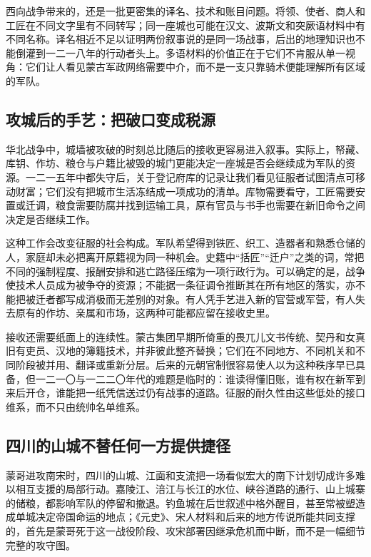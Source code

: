 西向战争带来的，还是一批更密集的译名、技术和账目问题。将领、使者、商人和工匠在不同文字里有不同转写；同一座城也可能在汉文、波斯文和突厥语材料中有不同名称。译名相近不足以证明两份叙事说的是同一场战事，后出的地理知识也不能倒灌到一二一八年的行动者头上。多语材料的价值正在于它们不肯服从单一视角：它们让人看见蒙古军政网络需要中介，而不是一支只靠骑术便能理解所有区域的军队。

\subsection{攻城后的手艺：把破口变成税源}

华北战争中，城墙被攻破的时刻总比随后的接收更容易进入叙事。实际上，帑藏、库钥、作坊、粮仓与户籍比被毁的城门更能决定一座城是否会继续成为军队的资源。一二一五年中都失守后，关于登记府库的记录让我们看见征服者试图清点可移动财富；它们没有把城市生活冻结成一项成功的清单。库物需要看守，工匠需要安置或迁调，粮食需要防腐并找到运输工具，原有官员与书手也需要在新旧命令之间决定是否继续工作。

这种工作会改变征服的社会构成。军队希望得到铁匠、织工、造器者和熟悉仓储的人，家庭却未必把离开原籍视为同一种机会。史籍中“括匠”“迁户”之类的词，常把不同的强制程度、报酬安排和逃亡路径压缩为一项行政行为。可以确定的是，战争使技术人员成为被争夺的资源；不能据一条征调令推断其在所有地区的落实，亦不能把被迁者都写成消极而无差别的对象。有人凭手艺进入新的官营或军营，有人失去原有的作坊、亲属和市场，这两种可能都应留在接收史里。

接收还需要纸面上的连续性。蒙古集团早期所倚重的畏兀儿文书传统、契丹和女真旧有吏员、汉地的簿籍技术，并非彼此整齐替换；它们在不同地方、不同机关和不同阶段被并用、翻译或重新分层。后来的元朝官制很容易使人以为这种秩序早已具备，但一二一〇与一二二〇年代的难题是临时的：谁读得懂旧账，谁有权在新军到来后开仓，谁能把一纸凭信送过仍有战事的道路。征服的耐久性由这些低处的接口维系，而不只由统帅名单维系。

\subsection{四川的山城不替任何一方提供捷径}

蒙哥进攻南宋时，四川的山城、江面和支流把一场看似宏大的南下计划切成许多难以相互支援的局部行动。嘉陵江、涪江与长江的水位、峡谷道路的通行、山上城寨的储粮，都影响军队的停留和撤退。钓鱼城在后世叙述中格外醒目，甚至常被塑造成单城决定帝国命运的地点；《元史》、宋人材料和后来的地方传说所能共同支撑的，首先是蒙哥死于这一战役阶段、攻宋部署因继承危机而中断，而不是一幅细节完整的攻守图。

